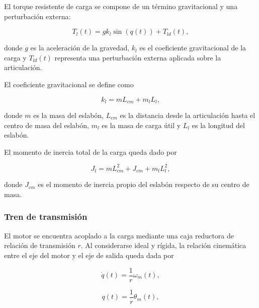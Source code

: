 \documentclass[10pt,a4paper]{article}
\begin{document}
El torque resistente de carga se compone de un término gravitacional y una perturbación externa:

\begin{equation}
    T_l(t)
    =
    g k_l \sin(q(t))
    +
    T_{ld}(t),
    \label{eq:torque_carga}
\end{equation}

donde \(g\) es la aceleración de la gravedad, \(k_l\) es el coeficiente gravitacional de la carga y \(T_{ld}(t)\) representa una perturbación externa aplicada sobre la articulación.

El coeficiente gravitacional se define como

\begin{equation}
    k_l
    =
    m L_{cm}
    +
    m_l L_l,
    \label{eq:coeficiente_gravitacional}
\end{equation}

donde \(m\) es la masa del eslabón, \(L_{cm}\) es la distancia desde la articulación hasta el centro de masa del eslabón, \(m_l\) es la masa de carga útil y \(L_l\) es la longitud del eslabón.

El momento de inercia total de la carga queda dado por

\begin{equation}
    J_l
    =
    m L_{cm}^{2}
    +
    J_{cm}
    +
    m_l L_l^{2},
    \label{eq:inercia_carga}
\end{equation}

donde \(J_{cm}\) es el momento de inercia propio del eslabón respecto de su centro de masa.

\subsubsection{Tren de transmisión}

El motor se encuentra acoplado a la carga mediante una caja reductora de relación de transmisión \(r\). Al considerarse ideal y rígida, la relación cinemática entre el eje del motor y el eje de salida queda dada por

\begin{equation}
    \dot{q}(t)
    =
    \frac{1}{r}\omega_m(t),
    \label{eq:velocidad_transmision}
\end{equation}

\begin{equation}
    q(t)
    =
    \frac{1}{r}\theta_m(t),
    \label{eq:posicion_transmision}
\end{equation}
\end{document}
